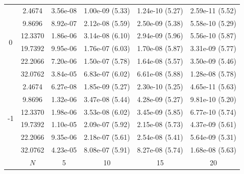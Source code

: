 \documentclass[onefignum,onetabnum,final]{siamart250211}
\numberwithin{equation}{section}
\newcommand\0{\boldsymbol{0}}
\begin{document}
\begin{table}[!hbt]
{\begin{tabular}{|c|c|cccc|}
				\hline
				\multirow{6}{0.02\linewidth}{0}&    2.4674 &   3.56e-08  &   1.00e-09 (5.33) &   1.24e-10 (5.27) &   2.59e-11 (5.52)   \\
				&    9.8696 &   8.92e-07  &   2.12e-08 (5.59) &   2.50e-09 (5.38) &   5.58e-10 (5.29)   \\
				&   12.3370 &   1.86e-06  &   3.14e-08 (6.10) &   2.94e-09 (5.96) &   5.56e-10 (5.87)   \\
				&   19.7392 &   9.95e-06  &   1.76e-07 (6.03) &   1.70e-08 (5.87) &   3.31e-09 (5.77)   \\
				&   22.2066 &   7.20e-06  &   1.50e-07 (5.78) &   1.64e-08 (5.57) &   3.50e-09 (5.46)   \\
				&   32.0762 &   3.84e-05  &   6.83e-07 (6.02) &   6.61e-08 (5.88) &   1.28e-08 (5.78)   \\
				\hline
				\multirow{6}{0.02\linewidth}{-1}&    2.4674 &   6.27e-08  &   1.85e-09 (5.27) &   2.30e-10 (5.25) &   4.65e-11 (5.63)   \\
				&    9.8696 &   1.32e-06  &   3.47e-08 (5.44) &   4.28e-09 (5.27) &   9.81e-10 (5.20)   \\
				&   12.3370 &   1.98e-06  &   3.53e-08 (6.02) &   3.45e-09 (5.85) &   6.77e-10 (5.74)   \\
				&   19.7392 &   1.10e-05  &   2.09e-07 (5.92) &   2.15e-08 (5.73) &   4.37e-09 (5.61)   \\
				&   22.2066 &   9.35e-06  &   2.18e-07 (5.61) &   2.54e-08 (5.41) &   5.64e-09 (5.31)   \\
				&   32.0762 &   4.23e-05  &   8.08e-07 (5.91) &   8.27e-08 (5.74) &   1.68e-08 (5.63)   \\
				\hline
				&$N$&5&10&15 &20\\
				\hline
				\hline
		\end{tabular}}
	\end{table}
	
\end{document}
